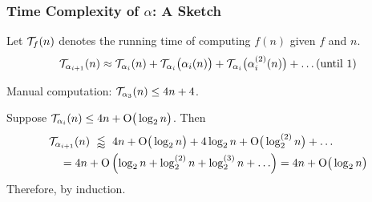 \begin{frame}
\frametitle{Time Complexity of $\alpha$: A Sketch}

Let $\mathcal{T}_f(n)$ denotes the running time of computing $f(n)$ given $f$ and $n$.
\pause
\begin{equation*}
\mathcal{T}_{\alpha_{i+1}}(n) \approx
\mathcal{T}_{\alpha_i}(n) + \mathcal{T}_{\alpha_i}\big(\alpha_i(n)\big)
+ \mathcal{T}_{\alpha_i}\big(\alpha_i^{(2)}(n)\big) + \ldots (\text{until 1})
\end{equation*}

\smallskip

\pause
Manual computation: $\mathcal{T}_{\alpha_3}(n)\le 4n + 4$.

\smallskip

\pause
Suppose $\mathcal{T}_{\alpha_i}(n) \le 4n + \text{O}\big(\log_2n\big)$. \pause Then
\begin{equation*}
\begin{aligned}
& \mathcal{T}_{\alpha_{i+1}}(n) \ \lessapprox \ 4n + \text{O}\big(\log_2n\big) + 4\log_2n + \text{O}\big(\log_2^{(2)}n\big) + \ldots \\
& \quad = 4n + \text{O}\left(\log_2n + \log_2^{(2)}n + \log_2^{(3)}n + \ldots\right)
 = 4n + \text{O}\big(\log_2n\big)
\end{aligned}
\end{equation*}
\pause
Therefore,  by induction.

\end{frame}
